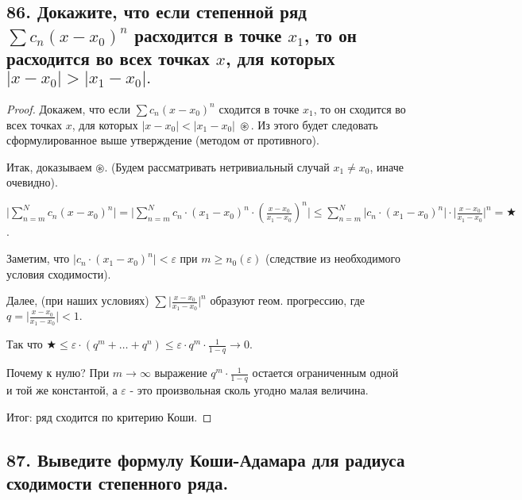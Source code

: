 \documentclass[a4paper, fleqn]{article}
\begin{document}
    \subsection*{86. Докажите, что если степенной ряд $\displaystyle \sum c_n (x - x_0)^n$ расходится в точке $x_1$, то он расходится во всех точках $x$, для которых $|x - x_0| > |x_1 - x_0|.$}
        
        \begin{proof}
        
        Докажем, что если $\displaystyle \sum c_n (x - x_0)^n$ сходится в точке $x_1$, то он сходится во всех точках $x$, для которых $|x - x_0| < |x_1 - x_0| \;  \circledast.$ Из этого будет следовать сформулированное выше утверждение (методом от противного).
        
        Итак, доказываем $\circledast$. (Будем рассматривать нетривиальный случай $x_1 \neq x_0$, иначе очевидно).
        
        $ \Bigg| \displaystyle \sum_{n = m}^{N} c_n (x - x_0)^n \Bigg| =
        \Bigg| \sum_{n = m}^{N} c_n \cdot (x_1 - x_0)^n \cdot \left( \frac{x - x_0}{x_1 - x_0} \right)^n \Bigg| \leq
        \sum_{n = m}^{N}  \big| c_n \cdot (x_1 - x_0)^n \big| \cdot \bigg| \frac{x - x_0}{x_1 - x_0} \bigg|^n = \bigstar$.
        
        Заметим, что $\big| c_n \cdot (x_1 - x_0)^n \big| < \varepsilon $ при $m \geq n_0 (\varepsilon)$ (следствие из необходимого условия сходимости).
        
        Далее, (при наших условиях) $\sum \bigg| \frac{x - x_0}{x_1 - x_0} \bigg|^n$ образуют геом. прогрессию, где $q = \bigg| \frac{x - x_0}{x_1 - x_0} \bigg| < 1.$
        
        Так что $\bigstar \leq \varepsilon \cdot (q^m + \dots + q^n)
        \leq \varepsilon \cdot  q^m \cdot \frac{1}{1 - q} \to 0.$ 
        
        Почему к нулю? При $m \to \infty $ выражение $q^m \cdot \frac{1}{1 - q}$ остается ограниченным одной и той же константой, а $\varepsilon$ - это произвольная сколь угодно малая величина.
        
        Итог: ряд сходится по критерию Коши.
        
        
        \end{proof}
        
    \subsection*{87. Выведите формулу Коши-Адамара для радиуса сходимости степенного ряда.}
    
\end{document}
